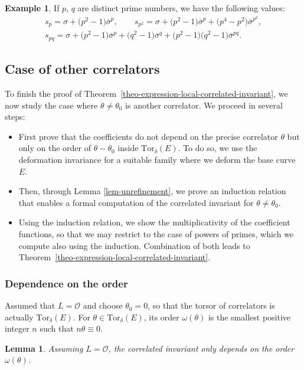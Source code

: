 \documentclass[pdftex]{sigma}
\newcommand{\Tor}{\mathrm{Tor}}
\newcommand{\pt}{\mathrm{pt}}
\newcommand{\bfw}{ {\boldsymbol w} }
\renewcommand{\O}{\mathcal{O}}
\numberwithin{equation}{section}
\newtheorem{lem}[theo]{Lemma}
\theoremstyle{definition}
\newtheorem{expl}[theo]{Example}
\begin{document}
\begin{expl}
If $p$, $q$ are distinct prime numbers, we have the following values:
 \begin{gather*}
s_p = \sigma+\bigl(p^2-1\bigr)\overline{\sigma}^p,\qquad
s_{p^2}= \sigma+\bigl(p^2-1\bigr)\overline{\sigma}^p+\bigl(p^4-p^2\bigr)\overline{\sigma}^{p^2},\\
s_{pq} = \sigma + \bigl(p^2-1\bigr)\overline{\sigma}^p + \bigl(q^2-1\bigr)\overline{\sigma}^q+\bigl(p^2-1\bigr)\bigl(q^2-1\bigr)\overline{\sigma}^{pq}.
\end{gather*}
\end{expl}


\subsection{Case of other correlators}

To finish the proof of Theorem~\ref{theo-expression-local-correlated-invariant}, we now study the case where $\theta\neq\theta_0$ is another correlator. We proceed in several steps:
 \begin{itemize}\itemsep=0pt %
 \item First prove that the coefficients do not depend on the precise correlator $\theta$ but only on the order of $\theta-\theta_0$ inside $\Tor_\delta(E)$. To do so, we use the deformation invariance for a suitable family where we deform the base curve $E$.
 \item Then, through Lemma \ref{lem-unrefinement}, we prove an induction relation that enables a formal computation of the correlated invariant for $\theta\neq \theta_0$.
 \item Using the induction relation, we show the multiplicativity of the coefficient functions, so that we may restrict to the case of powers of primes, which we compute also using the induction. Combination of both leads to Theorem~\ref{theo-expression-local-correlated-invariant}.
 \end{itemize}

\subsubsection{Dependence on the order} Assumed that $L=\O$ and choose $\theta_0=0$, so that the torsor of correlators is actually $\Tor_\delta(E)$. For $\theta\in\Tor_\delta(E)$, its order $\omega(\theta)$ is the smallest positive integer $n$ such that $n\theta\equiv 0$.

\begin{lem}
 Assuming $L=\O$, the correlated invariant \smash{$\langle \pt_0,1_{w_1},\pt_{w_2},\dots,\pt_{w_n}\rangle_{1,a[E],\bfw}^\theta$} only depends on the order $\omega(\theta)$.
\end{lem}
\end{document}
